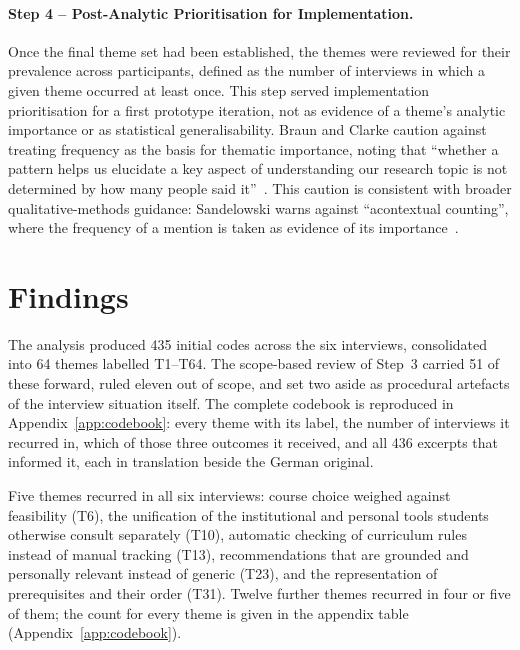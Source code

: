 \paragraph{Step 4 -- Post-Analytic Prioritisation for Implementation.}
\label{sec:prevalence-ranking}

Once the final theme set had been established, the themes were reviewed for their prevalence across participants, defined as the number of interviews in which a given theme occurred at least once. This step served implementation prioritisation for a first prototype iteration, not as evidence of a theme's analytic importance or as statistical generalisability. Braun and Clarke caution against treating frequency as the basis for thematic importance, noting that \enquote{whether a pattern helps us elucidate a key aspect of understanding our research topic is not determined by how many people said it}~\cite[p.~141]{braun_thematic_2022}. This caution is consistent with broader qualitative-methods guidance: Sandelowski warns against \enquote{acontextual counting}, where the frequency of a mention is taken as evidence of its importance~\cite[p.~239]{sandelowski_real_2001}.

\section{Findings}
\label{sec:formative-findings}

The analysis produced 435 initial codes across the six interviews, consolidated into 64 themes labelled T1--T64. The scope-based review of Step~3 carried 51 of these forward, ruled eleven out of scope, and set two aside as procedural artefacts of the interview situation itself. The complete codebook is reproduced in Appendix~\ref{app:codebook}: every theme with its label, the number of interviews it recurred in, which of those three outcomes it received, and all 436 excerpts that informed it, each in translation beside the German original.

Five themes recurred in all six interviews: course choice weighed against feasibility (T6), the unification of the institutional and personal tools students otherwise consult separately (T10), automatic checking of curriculum rules instead of manual tracking (T13), recommendations that are grounded and personally relevant instead of generic (T23), and the representation of prerequisites and their order (T31). Twelve further themes recurred in four or five of them; the count for every theme is given in the appendix table (Appendix~\ref{app:codebook}).

